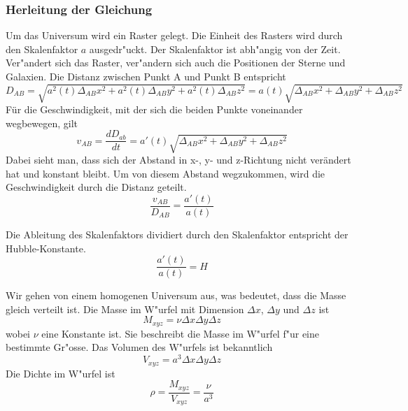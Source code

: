 \begin{refsection}
\subsubsection{Herleitung der Gleichung}
Um das Universum wird ein Raster gelegt. Die Einheit des Rasters wird durch den Skalenfaktor $a$ ausgedr"uckt. Der Skalenfaktor ist abh"angig von der Zeit. Ver"andert sich das Raster, ver"andern sich auch die Positionen der Sterne und Galaxien.
Die Distanz zwischen Punkt A und Punkt B entspricht 
\begin{equation}
D_{AB} = \sqrt{a^2(t)\Delta_{AB}x^2 + a^2(t)\Delta_{AB}y^2 + a^2(t)\Delta_{AB}z^2} = a(t) \sqrt{\Delta_{AB}x^2 + \Delta_{AB}y^2 + \Delta_{AB}z^2}
\end{equation}
F\"{u}r die Geschwindigkeit, mit der sich die beiden Punkte voneinander wegbewegen, gilt 
\begin{equation}
v_{AB} = \dfrac{dD_{ab}}{dt} 
	   = a'(t) \sqrt{\Delta_{AB}x^2 + \Delta_{AB}y^2 + \Delta_{AB}z^2}
\end{equation}
Dabei sieht man, dass sich der Abstand in x-, y- und z-Richtung nicht ver\"{a}ndert hat und konstant bleibt. Um von diesem Abstand wegzukommen, wird die Geschwindigkeit durch die Distanz geteilt.
\begin{equation}
\frac{v_{AB} }{D_{AB}} = \frac{a'(t)}{a(t)}
\label{friedmann:geschwindigkeit}
\end{equation}
\begin{satz} 
	Die Ableitung des Skalenfaktors dividiert durch den Skalenfaktor entspricht der Hubble-Konstante.
	\[
	\frac{a'(t)}{a(t)} = H
	\]
\end{satz}
Wir gehen von einem homogenen Universum aus, was bedeutet, dass die Masse gleich verteilt ist. Die Masse im W"urfel mit Dimension $\Delta x$, $\Delta y$ und $\Delta z$ ist 
\begin{equation}
M_{xyz} = \nu \Delta x \Delta y \Delta z
\end{equation}
wobei $\nu$ eine Konstante ist. Sie beschreibt die Masse im W"urfel f"ur eine bestimmte Gr"osse. Das Volumen des W"urfels ist bekanntlich 
\begin{equation}
V_{xyz} = a^3 \Delta x \Delta y \Delta z
\end{equation}
Die Dichte im W"urfel ist  
\begin{equation}
\rho = \frac{M_{xyz}}{V_{xyz}} = \frac{\nu}{a^3}
\label{friedmann:dichte}
\end{equation}

\end{refsection}
